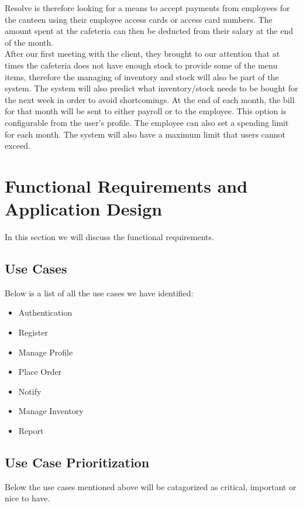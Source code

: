 \documentclass[a4paper,12pt]{article}
\begin{document}
Resolve is therefore looking for a means to accept payments from employees for the canteen using their employee access cards or access card numbers. The amount spent at the cafeteria can then be deducted from their salary at the end of the month.\\

After our first meeting with the client, they brought to our attention that at times the cafeteria does not have enough stock to provide some of the menu items, therefore the managing of inventory and stock will also be part of the system. The system will also predict what inventory/stock needs to be bought for the next week in order to avoid shortcomings. At the end of each month, the bill for that month will be sent to either payroll or to the employee. This option is configurable from the user's profile. The employee can also set a spending limit for each month. The system will also have a maximum limit that users cannot exceed.
 
\section{Functional Requirements and Application Design}
In this section we will discuss the functional requirements. \\

\subsection{Use Cases }
Below is a list of all the use cases we have identified:

\begin{itemize}

\item Authentication
\item Register
\item Manage Profile
\item Place Order
\item Notify
\item Manage Inventory
\item Report

\end{itemize}


\subsection{Use Case Prioritization}
Below the use cases mentioned above will be catagorized as critical, important or nice to have.
\end{document}
